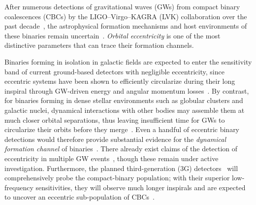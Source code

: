 \documentclass[reprint, superscriptaddress, amsmath, amssymb, aps, prl floatfix]{revtex4-2}
\begin{document}
After numerous detections of gravitational waves (GWs) from compact binary coalescences (CBCs) by the LIGO--Virgo--KAGRA (LVK) collaboration over the past decade~\citep{LIGOScientific:2018mvr, LIGOScientific:2020ibl, KAGRA:2021vkt, LIGOScientific:2025slb},
the astrophysical formation mechanisms and host environments of these binaries remain uncertain~\citep{LIGOScientific:2018jsj, LIGOScientific:2020kqk, KAGRA:2021duu, LIGOScientific:2025pvj}. \textit{Orbital eccentricity} is one of the most distinctive parameters that can trace their formation channels.

Binaries forming in isolation in galactic fields are expected to enter the sensitivity band of current ground-based detectors with negligible eccentricity, since eccentric systems have been shown to efficiently circularize during their long inspiral through GW-driven energy and angular momentum losses~\citep{Postnov:2014tza, PhysRev.136.B1224}. 
By contrast, for binaries forming in dense stellar environments such as globular clusters and galactic nuclei, dynamical interactions with other bodies may assemble them at much closer orbital separations, thus leaving insufficient time for GWs to circularize their orbits before they merge~\citep{Gultekin:2005fd, Samsing:2013kua, Antonini:2015zsa, Samsing:2017rat, Rodriguez:2017pec, Zevin:2018kzq, Samsing:2020tda, Fabj:2024jns, Samsing:2024syt, Kozai:1962zz, Lidov:1962wjn}.
Even a handful of eccentric binary detections would therefore provide substantial evidence for the \textit{dynamical formation channel} of binaries~\citep{Zevin:2021rtf}. 
There already exist claims of the detection of eccentricity in multiple GW events~\citep{Wu:2020zwr, Romero-Shaw:2021ual, Romero-Shaw:2022xko, Romero-Shaw:2020thy, Gayathri:2020coq, Gupte:2024jfe, Planas:2025jny, Morras:2025xfu, Planas:2025plq, Kacanja:2025kpr, Jan:2025fps}, though these remain under active investigation. 
Furthermore, the planned third-generation (3G) detectors~\citep{2017arXiv170200786A, Punturo:2010zz, Hild:2011np, Reitze:2019iox, LIGOScientific:2016wof} will comprehensively probe the compact-binary population; with their superior low-frequency sensitivities, they will observe much longer inspirals and are expected to uncover an eccentric sub-population of CBCs~\citep{Saini:2023wdk}.
\end{document}
